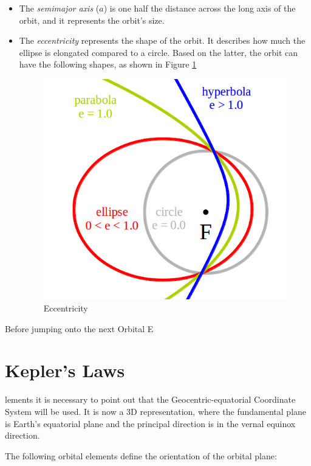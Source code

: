 \begin{itemize}
\item The \emph{semimajor axis} ($a$) is one half the distance across the long axis of the orbit, and it represents the orbit's size.
\item The \emph{eccentricity} represents the shape of the orbit. It describes how much the ellipse is elongated compared to a circle. Based on the latter, the orbit can have the following shapes, as shown in Figure \ref{f2.2}

\begin{figure}[H]
\centerline{\includegraphics[scale=0.35]{images/Eccentricity.png}}
\caption{Eccentricity}
\label{f2.2}
\end{figure}

\end{itemize}


Before jumping onto the next Orbital E\section{Kepler's Laws}\label{2.1}lements it is necessary to point out that the Geocentric-equatorial Coordinate System will be used. It is now a 3D representation, where the fundamental plane is Earth's equatorial plane and the principal direction is in the vernal equinox direction.

The following orbital elements define the orientation of the orbital plane:

